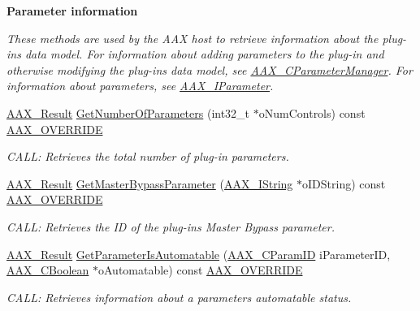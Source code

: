 \begin{Indent}\textbf{ Parameter information}\par
{\em These methods are used by the A\+AX host to retrieve information about the plug-\/in\textquotesingle{}s data model. For information about adding parameters to the plug-\/in and otherwise modifying the plug-\/in\textquotesingle{}s data model, see \mbox{\hyperlink{a01545}{A\+A\+X\+\_\+\+C\+Parameter\+Manager}}. For information about parameters, see \mbox{\hyperlink{a01857}{A\+A\+X\+\_\+\+I\+Parameter}}. }\begin{DoxyCompactItemize}
\item 
\mbox{\hyperlink{a00392_a4d8f69a697df7f70c3a8e9b8ee130d2f}{A\+A\+X\+\_\+\+Result}} \mbox{\hyperlink{a01481_ab22ac55f74401eddbe3f270435a74f70}{Get\+Number\+Of\+Parameters}} (int32\+\_\+t $\ast$o\+Num\+Controls) const \mbox{\hyperlink{a00392_ac2f24a5172689ae684344abdcce55463}{A\+A\+X\+\_\+\+O\+V\+E\+R\+R\+I\+DE}}
\begin{DoxyCompactList}\small\item\em C\+A\+LL\+: Retrieves the total number of plug-\/in parameters. \end{DoxyCompactList}\item 
\mbox{\hyperlink{a00392_a4d8f69a697df7f70c3a8e9b8ee130d2f}{A\+A\+X\+\_\+\+Result}} \mbox{\hyperlink{a01481_afe1313da2e24225af2f224623dca6b95}{Get\+Master\+Bypass\+Parameter}} (\mbox{\hyperlink{a01873}{A\+A\+X\+\_\+\+I\+String}} $\ast$o\+I\+D\+String) const \mbox{\hyperlink{a00392_ac2f24a5172689ae684344abdcce55463}{A\+A\+X\+\_\+\+O\+V\+E\+R\+R\+I\+DE}}
\begin{DoxyCompactList}\small\item\em C\+A\+LL\+: Retrieves the ID of the plug-\/in\textquotesingle{}s Master Bypass parameter. \end{DoxyCompactList}\item 
\mbox{\hyperlink{a00392_a4d8f69a697df7f70c3a8e9b8ee130d2f}{A\+A\+X\+\_\+\+Result}} \mbox{\hyperlink{a01481_a8a0890eacee81afbea6a5548592e1c8f}{Get\+Parameter\+Is\+Automatable}} (\mbox{\hyperlink{a00392_a1440c756fe5cb158b78193b2fc1780d1}{A\+A\+X\+\_\+\+C\+Param\+ID}} i\+Parameter\+ID, \mbox{\hyperlink{a00392_aa216506530f1d19a2965931ced2b274b}{A\+A\+X\+\_\+\+C\+Boolean}} $\ast$o\+Automatable) const \mbox{\hyperlink{a00392_ac2f24a5172689ae684344abdcce55463}{A\+A\+X\+\_\+\+O\+V\+E\+R\+R\+I\+DE}}
\begin{DoxyCompactList}\small\item\em C\+A\+LL\+: Retrieves information about a parameter\textquotesingle{}s automatable status. \end{DoxyCompactList}\item 

\end{DoxyCompactItemize}
\end{Indent}
